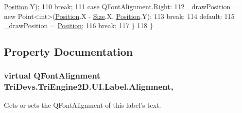 \begin{DoxyCode}
      \hyperlink{class_tri_devs_1_1_tri_engine2_d_1_1_u_i_1_1_label_adc1aa6af6f6ba7e66611ae9be5a1033b}{Position}.Y);
110                     \textcolor{keywordflow}{break};
111                 \textcolor{keywordflow}{case} QFontAlignment.Right:
112                     \_drawPosition = \textcolor{keyword}{new} Point<int>(\hyperlink{class_tri_devs_1_1_tri_engine2_d_1_1_u_i_1_1_label_adc1aa6af6f6ba7e66611ae9be5a1033b}{Position}.X - \hyperlink{class_tri_devs_1_1_tri_engine2_d_1_1_u_i_1_1_control_a9f162a69e4a170ed284cf13b0eaa655f}{Size}.X, 
      \hyperlink{class_tri_devs_1_1_tri_engine2_d_1_1_u_i_1_1_label_adc1aa6af6f6ba7e66611ae9be5a1033b}{Position}.Y);
113                     \textcolor{keywordflow}{break};
114                 \textcolor{keywordflow}{default}:
115                     \_drawPosition = \hyperlink{class_tri_devs_1_1_tri_engine2_d_1_1_u_i_1_1_label_adc1aa6af6f6ba7e66611ae9be5a1033b}{Position};
116                     \textcolor{keywordflow}{break};
117             \}
118         \}
\end{DoxyCode}


\subsection{Property Documentation}
\hypertarget{class_tri_devs_1_1_tri_engine2_d_1_1_u_i_1_1_label_a9070b8e7fd4e88683c44b1d3348753dc}{
\subsubsection[{Alignment}]{\setlength{\rightskip}{0pt plus 5cm}virtual Q\-Font\-Alignment Tri\-Devs.\-Tri\-Engine2\-D.\-U\-I.\-Label.\-Alignment\hspace{0.3cm}{\ttfamily [get]}, {\ttfamily [set]}}}\label{class_tri_devs_1_1_tri_engine2_d_1_1_u_i_1_1_label_a9070b8e7fd4e88683c44b1d3348753dc}


Gets or sets the Q\-Font\-Alignment of this label's text. 

